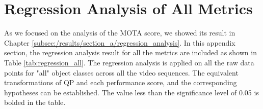 \section{Regression Analysis of All Metrics}
\label{sec:appendix/section_regression_all}
As we focused on the analysis of the MOTA score, we showed its result in Chapter \ref{subsec:/results/section_a/regression_analysis}. In this appendix section, the regression analysis result for all the metrics are included as shown in Table \ref{tab:regression_all}. The regression analysis is applied on all the raw data points for "all" object classes across all the video sequences. The equivalent transformations of QP and each performance score, and the corresponding hypotheses can be established. The value less than the significance level of 0.05 is bolded in the table.




